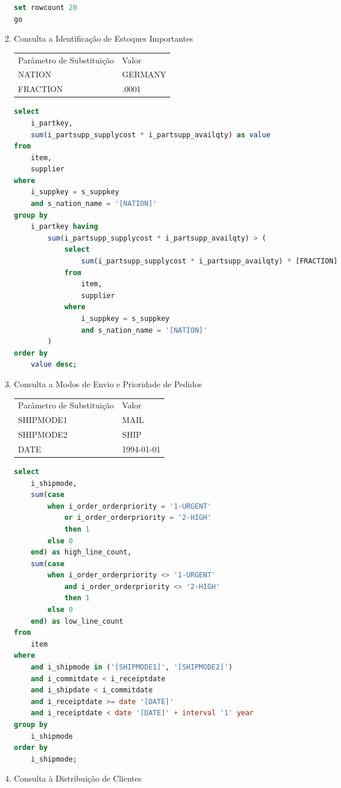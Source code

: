 \begin{enumerate}
\begin{lstlisting}[language=SQL]
set rowcount 20
go
	\end{lstlisting}

\item Consulta a Identificação de Estoques Importantes

\begin{tabular}{ll}
	Parâmetro de Substituição & Valor\\
	NATION & GERMANY\\
	FRACTION & .0001
\end{tabular}

	\begin{lstlisting}[language=SQL]
select
	i_partkey,
	sum(i_partsupp_supplycost * i_partsupp_availqty) as value
from
	item,
	supplier
where
	i_suppkey = s_suppkey
	and s_nation_name = '[NATION]'
group by
	i_partkey having
		sum(i_partsupp_supplycost * i_partsupp_availqty) > (
			select
				sum(i_partsupp_supplycost * i_partsupp_availqty) * [FRACTION]
			from
				item,
				supplier
			where
				i_suppkey = s_suppkey
				and s_nation_name = '[NATION]'
		)
order by
	value desc;
	\end{lstlisting}

\item Consulta a Modos de Envio e Prioridade de Pedidos

\begin{tabular}{ll}
	Parâmetro de Substituição & Valor\\
	SHIPMODE1 & MAIL\\
	SHIPMODE2 & SHIP\\
	DATE & 1994-01-01 \\
\end{tabular}

	\begin{lstlisting}[language=SQL]
select
	i_shipmode,
	sum(case
		when i_order_orderpriority = '1-URGENT'
			or i_order_orderpriority = '2-HIGH'
			then 1
		else 0
	end) as high_line_count,
	sum(case
		when i_order_orderpriority <> '1-URGENT'
			and i_order_orderpriority <> '2-HIGH'
			then 1
		else 0
	end) as low_line_count
from
	item
where
	and i_shipmode in ('[SHIPMODE1]', '[SHIPMODE2]')
	and i_commitdate < i_receiptdate
	and i_shipdate < i_commitdate
	and i_receiptdate >= date '[DATE]'
	and i_receiptdate < date '[DATE]' + interval '1' year
group by
	i_shipmode
order by
	i_shipmode;
	\end{lstlisting}
	
\item Consulta à Distribuição de Clientes


\end{enumerate}
